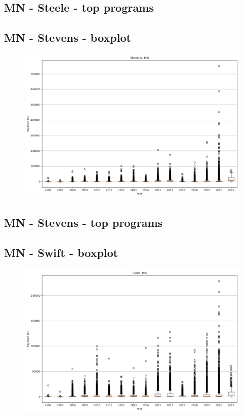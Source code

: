 \subsection*{MN - Steele - top programs}

\newpage
\subsection*{MN - Stevens - boxplot}
\begin{figure}[h]
\centering
\includegraphics[width=7in]{../output/boxplots/counties/Stevens-MN_boxplot.png}
\end{figure}


\subsection*{MN - Stevens - top programs}

\newpage
\subsection*{MN - Swift - boxplot}
\begin{figure}[h]
\centering
\includegraphics[width=7in]{../output/boxplots/counties/Swift-MN_boxplot.png}
\end{figure}



